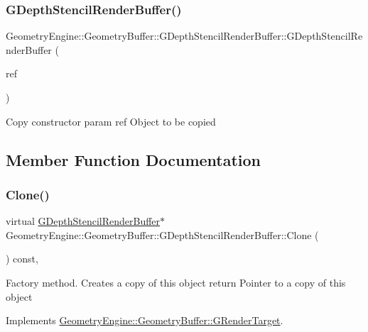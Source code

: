 \subsubsection{\texorpdfstring{GDepthStencilRenderBuffer()}{GDepthStencilRenderBuffer()}\hspace{0.1cm}{\footnotesize\ttfamily [3/3]}}
{\footnotesize\ttfamily Geometry\+Engine\+::\+Geometry\+Buffer\+::\+G\+Depth\+Stencil\+Render\+Buffer\+::\+G\+Depth\+Stencil\+Render\+Buffer (\begin{DoxyParamCaption}\item[{const \mbox{\hyperlink{class_geometry_engine_1_1_geometry_buffer_1_1_g_depth_stencil_render_buffer}{G\+Depth\+Stencil\+Render\+Buffer}} \&}]{ref }\end{DoxyParamCaption})}

Copy constructor param ref Object to be copied 

\subsection{Member Function Documentation}
\mbox{\label{class_geometry_engine_1_1_geometry_buffer_1_1_g_depth_stencil_render_buffer_a5c64d816141633964dd33605fbf42f97}} 
\subsubsection{\texorpdfstring{Clone()}{Clone()}}
{\footnotesize\ttfamily virtual \mbox{\hyperlink{class_geometry_engine_1_1_geometry_buffer_1_1_g_depth_stencil_render_buffer}{G\+Depth\+Stencil\+Render\+Buffer}}$\ast$ Geometry\+Engine\+::\+Geometry\+Buffer\+::\+G\+Depth\+Stencil\+Render\+Buffer\+::\+Clone (\begin{DoxyParamCaption}{ }\end{DoxyParamCaption}) const\hspace{0.3cm}{\ttfamily [inline]}, {\ttfamily [virtual]}}

Factory method. Creates a copy of this object return Pointer to a copy of this object 

Implements \mbox{\hyperlink{class_geometry_engine_1_1_geometry_buffer_1_1_g_render_target_a3b14d8929cf9d2acb6bc263c709ff019}{Geometry\+Engine\+::\+Geometry\+Buffer\+::\+G\+Render\+Target}}.

